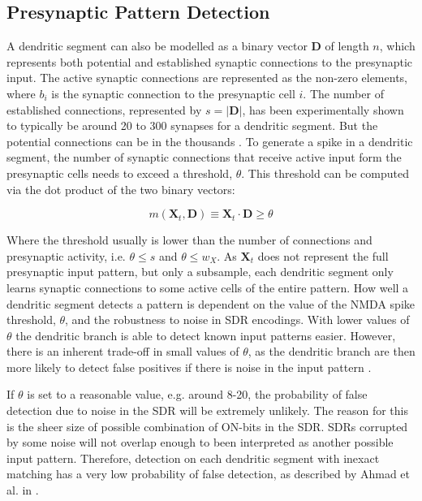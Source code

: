 \subsection{Presynaptic Pattern Detection}
A dendritic segment can also be modelled as a binary vector $\boldsymbol{D}$ of length $n$, which represents both potential and established synaptic connections to the presynaptic input. The active synaptic connections are represented as the non-zero elements, where $b_i$ is the synaptic connection to the presynaptic cell $i$. The number of established connections, represented by $s = | \boldsymbol{D} |$, has been experimentally shown to typically be around 20 to 300 synapses for a dendritic segment. But the potential connections can be in the thousands \cite{DBLP:journals/corr/AhmadH16}. To generate a spike in a dendritic segment, the number of synaptic connections that receive active input form the presynaptic cells needs to exceed a threshold, $\theta$. This threshold can be computed via the dot product of the two binary vectors:

\begin{equation}
    m(\boldsymbol{X}_t,\boldsymbol{D}) \equiv \boldsymbol{X}_t \cdot \boldsymbol{D} \geq \theta
\end{equation}


Where the threshold usually is lower than the number of connections and presynaptic activity, i.e. $\theta \leq s$ and $\theta \leq w_X$. As $\boldsymbol{X}_t$ does not represent the full presynaptic input pattern, but only a subsample, each dendritic segment only learns synaptic connections to some active cells of the entire pattern. How well a dendritic segment detects a pattern is dependent on the value of the NMDA spike threshold, $\theta$, and the robustness to noise in SDR encodings. With lower values of $\theta$ the dendritic branch is able to detect known input patterns easier. However, there is an inherent trade-off in small values of $\theta$, as the dendritic branch are then more likely to detect false positives if there is noise in the input pattern \cite{DBLP:journals/corr/AhmadH16}. 

If $\theta$ is set to a reasonable value, e.g. around 8-20, the probability of false detection due to noise in the SDR will be extremely unlikely. The reason for this is the sheer size of possible combination of ON-bits in the SDR. SDRs corrupted by some noise will not overlap enough to been interpreted as another possible input pattern. Therefore, detection on each dendritic segment with inexact matching has a very low probability of false detection, as described by Ahmad et al. in \cite{DBLP:journals/corr/AhmadH16}.


